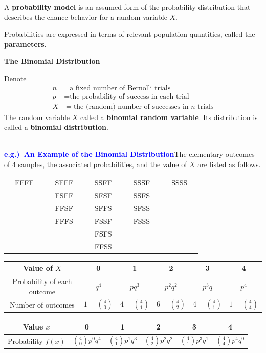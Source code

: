 \documentclass[12pt,a4paper]{article}
\newcommand{\eg}{\textcolor{blue}{\bf e.g.)\ }}
\begin{document}
\begin{tcolorbox}[colback=white]
	A \textbf{probability model} is an assumed form of the probability distribution that describes the chance behavior for a random variable $X$. \par
	Probabilities are expressed in terms of relevant population quantities, called the \textbf{parameters}.
\end{tcolorbox}
\begin{tcolorbox}[colback=white]
	\begin{center}	
	\textbf{The Binomial Distribution}\end{center}
	Denote \begin{align*}
		n &= \text{a fixed number of Bernolli trials} \\
		p &= \text{the probability of success in each trial} \\
		X &= \text{the (random) number of successes in $n$ trials}
	\end{align*} The random variable $X$ called a \textbf{binomial random variable}. Its distribution is called a \textbf{binomial distribution}.
\end{tcolorbox}\ \\
\eg\textcolor{blue}{\bf An Example of the Binomial Distribution}\quad The elementary outcomes of 4 samples, the associated probabilities, and the value of $X$ are listed as follows. \begin{center}
	\begin{tabular}{ccc ccc ccc ccc ccc}
	& FFFF &&& SFFF &&& SSFF &&& SSSF &&& SSSS & \\
	& 	   &&& FSFF &&& SFSF &&& SSFS &&& & \\
	& 	   &&& FFSF &&& SFFS &&& SFSS &&& & \\
	& 	   &&& FFFS &&& FSSF &&& FSSS &&& & \\
	& 	   &&&      &&& FSFS &&& &&& & \\
	& 	   &&&      &&& FFSS &&& &&& & \\
\end{tabular}\end{center}
\begin{center}\begin{tabular}{c||ccccc}
	\toprule[1.2pt]
	Value of $X$ & 0 & 1 & 2 & 3 & 4 \\
	\hline
	Probability of each outcome & $q^4$ & $pq^3$ & $p^2q^2$ & $p^3q$ & $p^4$ \\
	\hline
	Number of outcomes & $1=\binom{4}{0}$ & $4=\binom{4}{1}$ & $6=\binom{4}{2}$ & $4=\binom{4}{1}$ & $1=\binom{4}{4}$ \\
	\bottomrule[1.2pt] 
\end{tabular}\end{center}
\begin{center}\begin{tabular}{c||ccccc}
	\toprule[1.2pt]
	Value $x$ & 0 & 1 & 2 & 3 & 4 \\
	\hline
	Probability $f(x)$ & $\binom{4}{0}p^0q^4$ & $\binom{4}{1}p^1q^3$ & $\binom{4}{2}p^2q^2$ & $\binom{4}{1}p^3q^1$ & $\binom{4}{4}p^4q^0$ \\
	\bottomrule[1.2pt]
\end{tabular}
\end{center}
\end{document}
